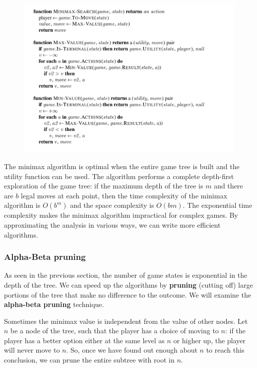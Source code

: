 \documentclass{article}
\begin{document}
\begin{figure}[h]
    \centering
    \includegraphics[width=1\linewidth]{algorithms/Minimax.png}
    \label{fig:minimax_algorithm}
\end{figure}

The minimax algorithm is optimal when the entire game tree is built and the utility function can be used. The algorithm performs a complete depth-first exploration of the game tree: if the maximum depth of the tree is $m$ and there are $b$ legal moves at each point, then the time complexity of the minimax algorithm is $O(b^m)$ and the space complexity is $O(bm)$. The exponential time complexity makes the minimax algorithm impractical for complex games. By approximating the analysis in various ways, we can write more efficient algorithms.

\subsubsection{Alpha-Beta pruning}
As seen in the previous section, the number of game states is exponential in the depth of the tree. We can speed up the algorithms by \textbf{pruning} (cutting off) large portions of the tree that make no difference to the outcome. We will examine the \textbf{alpha-beta pruning} technique.

Sometimes the minimax value is independent from the value of other nodes. Let $n$ be a node of the tree, such that the player has a choice of moving to $n$: if the player has a better option either at the same level as $n$ or higher up, the player will never move to $n$. So, once we have found out enough about $n$ to reach this conclusion, we can prune the entire subtree with root in $n$. 
\end{document}
